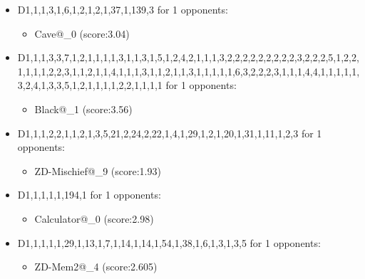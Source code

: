\begin{appendices}
\begin{itemize}
        \item D1,1,1,3,1,6,1,2,1,2,1,37,1,139,3 for 1 opponents:
        \begin{multicols}{3}
            \begin{itemize}
                \item Cave@\_0 (score:3.04)
            \end{itemize}
        \end{multicols}

        \item D1,1,1,3,3,7,1,2,1,1,1,1,3,1,1,3,1,5,1,2,4,2,1,1,1,3,2,2,2,2,2,2,2,2,2,3,2,2,2,5,1,2,2,1,1,1,1,2,2,3,1,1,2,1,1,4,1,1,1,3,1,1,2,1,1,3,1,1,1,1,1,6,3,2,2,2,3,1,1,1,4,4,1,1,1,1,1,3,2,4,1,3,3,5,1,2,1,1,1,1,2,2,1,1,1,1 for 1 opponents:
        \begin{multicols}{3}
            \begin{itemize}
                \item Black@\_1 (score:3.56)
            \end{itemize}
        \end{multicols}

        \item D1,1,1,2,2,1,1,2,1,3,5,21,2,24,2,22,1,4,1,29,1,2,1,20,1,31,1,11,1,2,3 for 1 opponents:
        \begin{multicols}{3}
            \begin{itemize}
                \item ZD-Mischief@\_9 (score:1.93)
            \end{itemize}
        \end{multicols}

        \item D1,1,1,1,1,194,1 for 1 opponents:
        \begin{multicols}{3}
            \begin{itemize}
                \item Calculator@\_0 (score:2.98)
            \end{itemize}
        \end{multicols}

        \item D1,1,1,1,1,29,1,13,1,7,1,14,1,14,1,54,1,38,1,6,1,3,1,3,5 for 1 opponents:
        \begin{multicols}{3}
            \begin{itemize}
                \item ZD-Mem2@\_4 (score:2.605)
            \end{itemize}
        \end{multicols}


\end{itemize}
\end{appendices}
